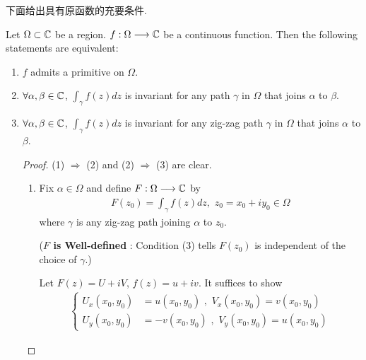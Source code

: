 	\vspace{2em}
	下面给出具有原函数的充要条件.
	\begin{thm}\label{thm 4.1.3}
		Let $\Omega \subset \mathbb{C}$ be a region. $f : \Omega \longrightarrow \mathbb{C}$ be a continuous function. Then the following statements are equivalent:
		\begin{enumerate}
			\item[(1)]$f$ admits a primitive on $\Omega$.
			
			\item[(2)]$\forall \alpha , \beta \in \mathbb{C}$, $\int_{\gamma}{f(z) dz}$ is invariant for any path $\gamma$ in $\Omega$ that joins $\alpha$ to $\beta$.
			
			\item[(3)]$\forall \alpha , \beta \in \mathbb{C}$, $\int_{\gamma}{f(z) dz}$ is invariant for any zig-zag path $\gamma$ in $\Omega$ that joins $\alpha$ to $\beta$.
			
			\vspace{2em}
			\begin{proof}
				(1) $\Rightarrow$ (2) and (2) $\Rightarrow$ (3) are clear.
				\begin{enumerate}
					\item[(3) $\Rightarrow$ (1):]Fix $\alpha \in \Omega$ and define $F : \Omega \longrightarrow \mathbb{C}$ by 
					\begin{align}
						F(z_0) = \int_{\gamma}{f(z) dz} , \,\, z_0 = x_0 + i y_0 \in \Omega
					\end{align}
					where $\gamma$ is any zig-zag path joining $\alpha$ to $z_0$.
					\begin{center}
						(\textbf{$F$ is Well-defined} : Condition (3) tells $F(z_0)$ is independent of the choice of $\gamma$.)
					\end{center}
					
					\vspace{1.5em}
					Let $F(z) = U + i V$, $f(z) = u + i v$. It suffices to show
					\begin{align}
						\begin{cases}
							U_{x}(x_0 , y_0) &= u(x_0 , y_0) \,\, , \,\, V_{x}(x_0 , y_0) = v(x_0 , y_0) \\
							U_{y}(x_0 , y_0) &= -v(x_0 , y_0) \,\, , \,\, V_{y}(x_0 , y_0) = u(x_0 , y_0)
						\end{cases}
					\end{align}
					

\end{enumerate}
\end{proof}
\end{enumerate}
\end{thm}
